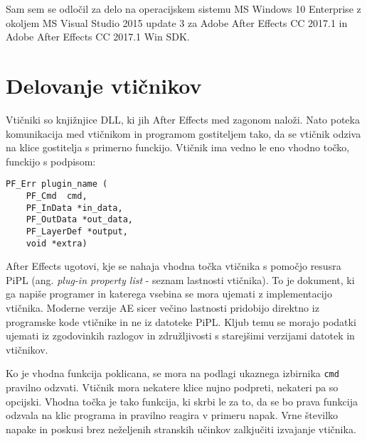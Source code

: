 \documentclass[a4paper, 12pt]{book}
\begin{document}
Sam sem se odločil za delo na operacijskem sistemu MS Windows 10 Enterprise z okoljem MS Visual Studio 2015 update 3 za Adobe After Effects CC 2017.1 in Adobe After Effects CC 2017.1 Win SDK. 


\section{Delovanje vtičnikov}
Vtičniki so knjižnjice DLL, ki jih After Effects med zagonom naloži. 
Nato poteka komunikacija med vtičnikom in programom gostiteljem tako, da se vtičnik odziva na klice gostitelja s primerno funckijo. 
Vtičnik ima vedno le eno vhodno točko, funckijo s podpisom:
\begin{verbatim}
PF_Err plugin_name (
    PF_Cmd	cmd,
    PF_InData *in_data,
    PF_OutData *out_data,
    PF_LayerDef *output,
    void *extra)
\end{verbatim}

After Effects ugotovi, kje se nahaja vhodna točka vtičnika s pomočjo resusra PiPL (ang. {\it plug-in property list} - seznam lastnosti vtičnika).
To je dokument, ki ga napiše programer in katerega vsebina se mora ujemati z implementacijo vtičnika. 
Moderne verzije AE sicer večino lastnosti pridobijo direktno iz programske kode vtičnike in ne iz datoteke PiPL. 
Kljub temu se morajo podatki ujemati iz zgodovinkih razlogov in združljivosti s starejšimi verzijami datotek in vtičnikov. 

Ko je vhodna funkcija poklicana, se mora na podlagi ukaznega izbirnika \texttt{cmd} pravilno odzvati. 
Vtičnik mora nekatere klice nujno podpreti, nekateri pa so opcijski. 
Vhodna točka je tako funkcija, ki skrbi le za to, da se bo prava funkcija odzvala na klic programa in pravilno reagira v primeru napak. 
Vrne številko napake in poskusi brez neželjenih stranskih učinkov zalkjučiti izvajanje vtičnika.
\end{document}
